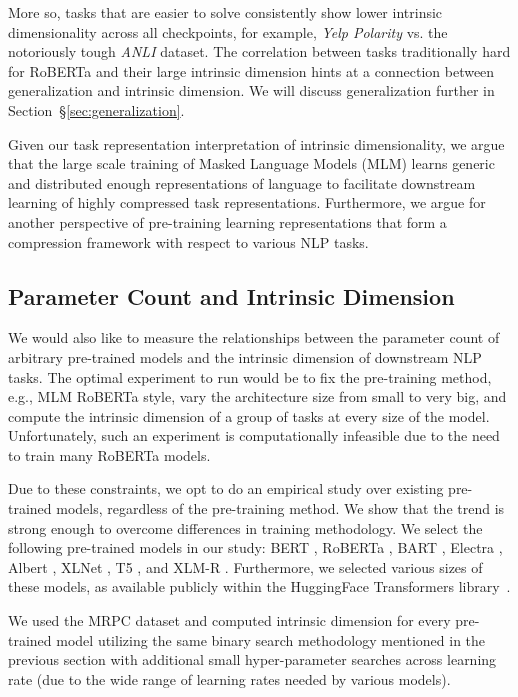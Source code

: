 \documentclass{article} \usepackage{iclr2020_conference,times}
\begin{document}
More so, tasks that are easier to solve consistently show lower intrinsic dimensionality across all checkpoints, for example, \textit{Yelp Polarity} vs. the notoriously tough \textit{ANLI} dataset. The correlation between tasks traditionally hard for RoBERTa and their large intrinsic dimension hints at a connection between generalization and intrinsic dimension. We will discuss generalization further in Section~\S\ref{sec:generalization}.

Given our task representation interpretation of intrinsic dimensionality, we argue that the large scale training of Masked Language Models (MLM) learns generic and distributed enough representations of language to facilitate downstream learning of highly compressed task representations. Furthermore, we argue for another perspective of pre-training learning representations that form a compression framework with respect to various NLP tasks.


\subsection{Parameter Count and Intrinsic Dimension}
\label{section:parameter_exploration}
We would also like to measure the relationships between the parameter count of arbitrary pre-trained models and the intrinsic dimension of downstream NLP tasks. The optimal experiment to run would be to fix the pre-training method, e.g., MLM RoBERTa style, vary the architecture size from small to very big, and compute the intrinsic dimension of a group of tasks at every size of the model. Unfortunately, such an experiment is computationally infeasible due to the need to train many RoBERTa models.

Due to these constraints, we opt to do an empirical study over existing pre-trained models, regardless of the pre-training method. We show that the trend is strong enough to overcome differences in training methodology. We select the following pre-trained models in our study: BERT \citep{BERT}, RoBERTa \citep{ROBERTA}, BART \citep{BART}, Electra \citep{ELECTRA}, Albert \citep{ALBERT}, XLNet \citep{XLNET}, T5 \citep{T5}, and XLM-R \citep{XLMR}. Furthermore, we selected various sizes of these models, as available publicly within the HuggingFace Transformers library~\citep{huggingface}.

We used the MRPC dataset and computed intrinsic dimension for every pre-trained model utilizing the same binary search methodology mentioned in the previous section with additional small hyper-parameter searches across learning rate (due to the wide range of learning rates needed by various models). 
\end{document}
